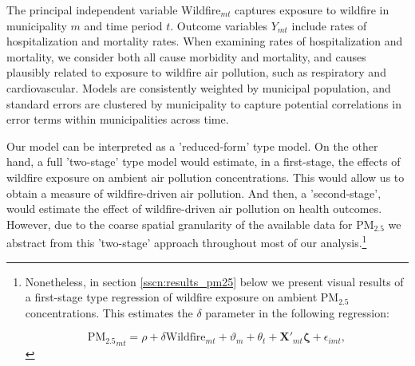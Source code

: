 \documentclass[11pt]{article}
\begin{document}
\begin{spacing}{1.3}
The principal independent variable Wildfire$_{mt}$ captures exposure to wildfire in municipality $m$ and time period $t$.
Outcome variables $Y_{mt}$ include rates of hospitalization and mortality rates. When examining rates of hospitalization and mortality, we consider both all cause morbidity and mortality, and causes plausibly related to exposure to wildfire air pollution, such as respiratory and cardiovascular. Models are consistently weighted by municipal population, and standard errors are clustered by municipality to capture potential correlations in error terms within municipalities across time.

Our model can be interpreted as a 'reduced-form' type model. On the other hand, a full 'two-stage' type model would estimate, in a first-stage, the effects of wildfire exposure on ambient air pollution concentrations. This would allow us to obtain a measure of wildfire-driven air pollution. And then, a 'second-stage', would estimate the effect of wildfire-driven air pollution on health outcomes. However, due to the coarse spatial granularity of the available data for PM$_{2.5}$ we abstract from this 'two-stage' approach throughout most of our analysis.\footnote{Nonetheless, in section \ref{sscn:results_pm25} below we present visual results of a first-stage type regression of wildfire exposure on ambient PM$_{2.5}$ concentrations. This estimates the $\delta$ parameter in the following regression:

\begin{equation}
\label{eq:FirstStagePM}
\text{PM$_{2.5}$}_{mt}=\rho + \delta\text{Wildfire}_{mt} + \vartheta_m + \theta_t + \bm{X}'_{mt}\bm{\zeta} + \epsilon_{imt},
\end{equation}
} 


\end{spacing}
\end{document}
